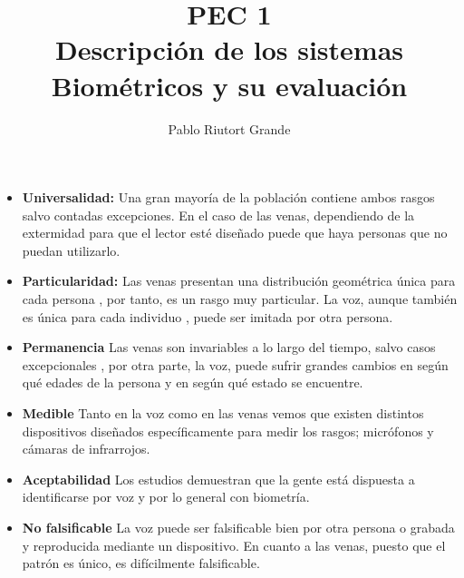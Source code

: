 \documentclass[10pt,a4paper]{article}
\author{Pablo Riutort Grande}
\title{PEC 1\\ \vspace{1cm}\textbf{Descripción de los sistemas Biométricos y su evaluación}}
\begin{document}
\maketitle
\pagebreak

\section{}
\subsection{}

\begin{itemize}
\item \textbf{Universalidad:}
Una gran mayoría de la población contiene ambos rasgos salvo contadas excepciones. En el caso de las venas, dependiendo de la extermidad para que el lector esté diseñado puede que haya personas que no puedan utilizarlo.
\item \textbf{Particularidad:} Las venas presentan una distribución geométrica única para cada persona \cite{venas}, por tanto, es un rasgo muy particular. La voz, aunque también es única para cada individuo \cite{voz}, puede ser imitada por otra persona.
\item \textbf{Permanencia} Las venas son invariables a lo largo del tiempo, salvo casos excepcionales \cite{venas}, por otra parte, la voz, puede sufrir grandes cambios en según qué edades de la persona y en según qué estado se encuentre.
\item \textbf{Medible} Tanto en la voz como en las venas vemos que existen distintos dispositivos diseñados específicamente para medir los rasgos; micrófonos y cámaras de infrarrojos.
\item \textbf{Aceptabilidad} Los estudios demuestran que la gente está dispuesta a identificarse por voz \cite{voz} y por lo general con biometría.
\item \textbf{No falsificable} La voz puede ser falsificable bien por otra persona o grabada y reproducida mediante un dispositivo. En cuanto a las venas, puesto que el patrón es único, es difícilmente falsificable.
\end{itemize}

\begin{table}[htpb!]
  \caption{Bondad de los rasgos biométricos vasculares y de voz discretizada en tres valores: A (alto), M (medio) y B (bajo)}
  \label{tabla:bondad1}
\end{table}
\end{document}
